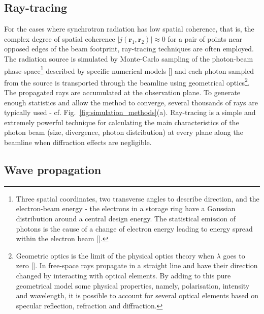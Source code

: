 \begin{refsection}
\subsection{Ray-tracing}\label{sec:ray_tracing}
 For the cases where synchrotron radiation has low spatial coherence, that is, the complex degree of spatial coherence $|j(\textbf{r}_1,\textbf{r}_2)|\approx0$ for a pair of points near opposed edges of the beam footprint, ray-tracing techniques are often employed. The radiation source is simulated by Monte-Carlo sampling of the photon-beam phase-space\footnote{Three spatial coordinates, two transverse angles to describe direction, and the electron-beam energy - the electrons in a storage ring have a Gaussian distribution around a central design energy. The statistical emission of photons is the cause of a change of electron energy leading to energy spread within the electron beam [\cite[\textit{8.3.1}]{Wiedemann2015}].} described by specific numerical models [\cite{Canestrari2013}] and each photon sampled from the source is transported through the beamline using geometrical optics\footnote{Geometric optics is the limit of the physical optics theory when $\lambda$ goes to zero [\cite[\textit{§1.3.C} \& \textit{§2.3}]{Saleh2019}]. In free-space rays propagate in a straight line and have their direction changed by interacting with optical elements. By adding to this pure geometrical model some physical properties, namely, polarisation, intensity and wavelength, it is possible to account for several optical elements based on specular reflection, refraction and diffraction.}. The propagated rays are accumulated at the observation plane. To generate enough statistics and allow the method to converge, several thousands of rays are typically used - cf. Fig.~\ref{fig:simulation_methods}(a). Ray-tracing is a simple and extremely powerful technique for calculating the main characteristics of the photon beam (size, divergence, photon distribution) at every plane along the beamline when diffraction effects are negligible.

\subsection{Wave propagation}\label{sec:wave_propag}


\end{refsection}
